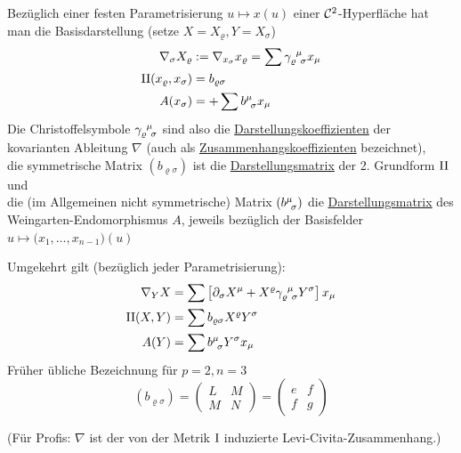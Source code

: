 \begin{folgerung}
 Bezüglich einer festen Parametrisierung \(u \mapsto x(u)\) einer \(\mathcal{C}^2\)-Hyperfläche hat man die Basisdarstellung (setze \(X = X_\varrho, Y = X_\sigma\))
 \begin{align*}
  \nabla_\sigma X_\varrho &:= \nabla_{x_\sigma} x_\varrho = \sum \christ \varrho \mu \sigma x_\mu \\
  \Rom 2 (x_\varrho, x_\sigma) &= b_{\varrho \sigma} \\
  A(x_\sigma) &= + \sum \wein \mu \sigma x_\mu
 \end{align*}
Die Christoffelsymbole \(\gamma_{\varrho \;\, \sigma}^{\;\, \mu}\) sind also die \uline{Darstellungskoeffizienten} der kovarianten Ableitung \(\nabla\) (auch als \uline{Zusammenhangskoeffizienten} bezeichnet), \\
die symmetrische Matrix \((b_{\varrho \sigma})\) ist die \uline{Darstellungsmatrix} der 2. Grundform \(\Rom 2\) und \\
die (im Allgemeinen nicht symmetrische) Matrix \((b^{\mu}_{\;\, \sigma} )\) die \uline{Darstellungsmatrix} des Weingarten-Endomorphismus \(A\), jeweils bezüglich der Basisfelder \(u \mapsto \big(x_1, \dots, x_{n-1}\big) (u)\) \par
Umgekehrt gilt (bezüglich jeder Parametrisierung):
\begin{align*}
 \nabla_Y X &= \sum \left[ \partial_\sigma X^\mu + X^\varrho \christ \varrho \mu \sigma Y^\sigma \right] x_\mu \\
 \Rom 2 (X,Y) &= \sum b_{\varrho \sigma} X^\varrho Y^\sigma \\
 A(Y) &= \sum \wein \mu \sigma Y^\sigma x_\mu
\end{align*}
Früher übliche Bezeichnung für \(p = 2, n = 3\)
\[
 (b_{\varrho \sigma}) = \begin{pmatrix}
                        L & M \\
                        M & N
                       \end{pmatrix} = 
                       \begin{pmatrix}
                        e & f \\
                        f & g
                       \end{pmatrix}
\]
\end{folgerung}

(Für Profis: \(\nabla\) ist der von der Metrik \(\Rom 1\) induzierte Levi-Civita-Zusammenhang.)

